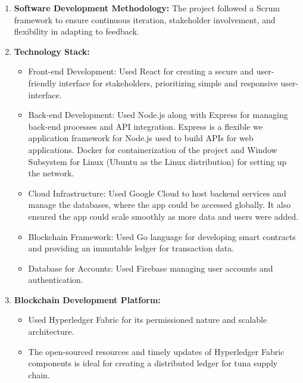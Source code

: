 \begin{enumerate}
	\item \textbf{Software Development Methodology:} The project followed a Scrum framework to ensure continuous iteration, stakeholder involvement, and flexibility in adapting to feedback.
	\item \textbf{Technology Stack:} 
		\begin{itemize}
			\item Front-end Development: Used React for creating a secure and user-friendly interface for stakeholders, prioritizing simple and responsive user-interface.
			\item Back-end Development: Used Node.js along with Express for managing back-end processes and API integration. Express is a flexible we application framework for Node.js used to build APIs for web applications. Docker for containerization of the project and Window Subsystem for Linux (Ubuntu as the Linux distribution) for setting up the network.
			\item Cloud Infrastructure: Used Google Cloud to host backend services and manage the databases, where the app could be accessed globally. It also ensured the app could scale smoothly as more data and users were added.  
			\item Blockchain Framework: Used Go language for developing smart contracts and providing an immutable ledger for transaction data.
			\item Database for Accounts: Used Firebase managing user accounts and authentication.
		\end{itemize}
	\item \textbf{Blockchain Development Platform:} 
		\begin{itemize}
			\item Used Hyperledger Fabric for its permissioned nature and scalable architecture.
			\item The open-sourced resources and timely updates of Hyperledger Fabric components is ideal for creating a distributed ledger for tuna supply chain.
		\end{itemize}
\end{enumerate}

